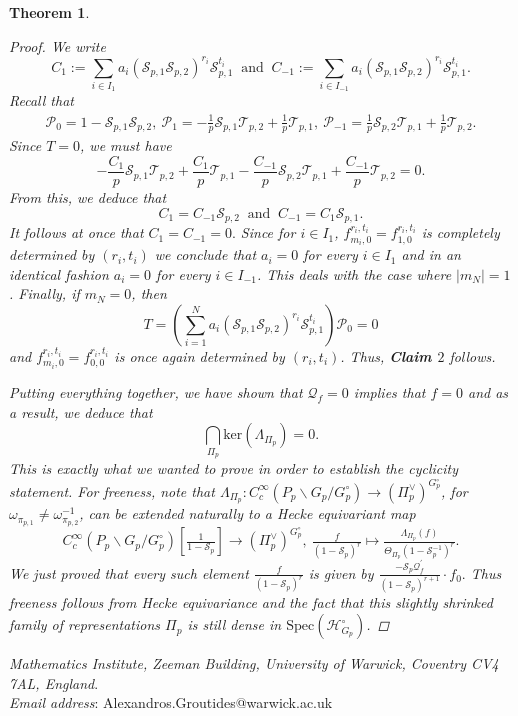 \documentclass{amsart}%
\theoremstyle{plain}
\newtheorem{thm}{Theorem}[subsection]
\theoremstyle{plain}
\theoremstyle{remark}
\begin{document}
\begin{thm}
\begin{proof}
 We write 
 $$C_1:=\sum_{i\in I_1}a_i(\mathcal{S}_{p,1}\mathcal{S}_{p,2})^{r_i}\mathcal{S}_{p,1}^{t_i}\ \text{ and }\ C_{-1}:=\sum_{i\in I_{-1}}a_i(\mathcal{S}_{p,1}\mathcal{S}_{p,2})^{r_i}\mathcal{S}_{p,1}^{t_i}.$$
 Recall that 
 \begin{align*}
     \mathscr{P}_0=1-\mathcal{S}_{p,1}\mathcal{S}_{p,2},\ 
     \mathscr{P}_1=-\frac{1}{p}\mathcal{S}_{p,1}\mathcal{T}_{p,2}+\frac{1}{p}\mathcal{T}_{p,1},\
     \mathscr{P}_{-1}=\frac{1}{p}\mathcal{S}_{p,2}\mathcal{T}_{p,1}+\frac{1}{p}\mathcal{T}_{p,2}.
 \end{align*}
 Since $T=0$, we must have
 $$-\frac{C_1}{p}\mathcal{S}_{p,1}\mathcal{T}_{p,2}+\frac{C_1}{p}\mathcal{T}_{p,1}-\frac{C_{-1}}{p}\mathcal{S}_{p,2}\mathcal{T}_{p,1}+\frac{C_{-1}}{p}\mathcal{T}_{p,2}=0.$$
 From this, we deduce that
 $$C_1=C_{-1}\mathcal{S}_{p,2}\ \text{ and }\ C_{-1}=C_1\mathcal{S}_{p,1}.$$
 It follows at once that $C_1=C_{-1}=0.$ Since for $i\in I_1$, $f_{m_i,0}^{r_i,t_i}=f_{1,0}^{r_i,t_i}$ is completely determined by $(r_i,t_i)$ we conclude that $a_i=0$ for every $i\in I_1$ and in an identical fashion $a_i=0$ for every $i\in I_{-1}$. This deals with the case where $|m_N|=1$. Finally, if $m_N=0$, then 
 $$T=\left(\sum_{i=1}^{N}a_i(\mathcal{S}_{p,1}\mathcal{S}_{p,2})^{r_i}\mathcal{S}_{p,1}^{t_i}\right)\mathscr{P}_0=0$$
 and $f_{m_i,0}^{r_i,t_i}=f_{0,0}^{r_i,t_i}$ is once again determined by $(r_i,t_i)$. Thus, \textbf{Claim $2$} follows.
 
 Putting everything together, we have shown that $\mathscr{Q}_f=0$ implies that $f=0$ and as a result, we deduce that
 $$\bigcap_{\Pi_p} \mathrm{ker}(\Lambda_{\Pi_p})=0.$$
 This is exactly what we wanted to prove in order to establish the cyclicity statement. For freeness, note that $\Lambda_{\Pi_p}:C_c^\infty(P_p\backslash G_p/G_p^\circ)\rightarrow(\Pi_p^\vee)^{G_p^\circ}$, for $\omega_{\pi_{p,1}}\neq \omega_{\pi_{p,2}}^{-1}$, can be extended naturally to a Hecke equivariant map  $$C_c^\infty(P_p\backslash G_p/G_p^\circ)[\tfrac{1}{1-\mathcal{S}_p}]\longrightarrow (\Pi_p^\vee)^{G_p^\circ},\ \tfrac{f}{(1-\mathcal{S}_p)^r}\mapsto\tfrac{\Lambda_{\Pi_p}(f)}{\Theta_{\Pi_p}(1-\mathcal{S}_p^{-1})^r}.$$
 We just proved that every such element $\tfrac{f}{(1-\mathcal{S}_p)^r}$ is given by $\tfrac{-\mathcal{S}_p\mathcal{Q}_f^{'}}{(1-\mathcal{S}_p)^{r+1}}\cdot f_0.$ Thus freeness follows from Hecke equivariance and the fact that this slightly shrinked family of representations $\Pi_p$ is still dense in $\mathrm{Spec}(\mathcal{H}_{G_p}^\circ)$.
    \end{proof}
\end{thm}
     




\noindent\textit{Mathematics Institute, Zeeman Building, University of Warwick, Coventry CV4 7AL,
England}.\\
\textit{Email address}: Alexandros.Groutides@warwick.ac.uk
\end{document}
